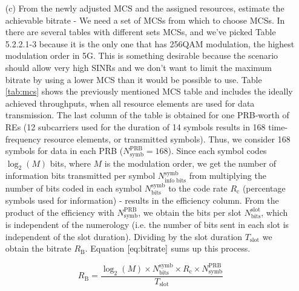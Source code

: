\begin{itemize}
\begin{itemize}
        \item[(c)] From the newly adjusted MCS and the assigned resources, estimate the achievable bitrate - 
        We need a set of MCSs from which to choose MCSs. In \cite{3gpp-codebooks} there are several tables with different sets MCSs, and we've picked Table 5.2.2.1-3 because it is the only one that has 256QAM modulation, the highest modulation order in 5G. This is something desirable because the scenario should allow very high SINRs and we don't want to limit the maximum bitrate by using a lower MCS than it would be possible to use. Table \ref{tab:mcs} shows the previously mentioned MCS table and includes the ideally achieved throughputs, when all resource elements are used for data transmission. The last column of the table is obtained for one PRB-worth of \acsp{RE} (12 subcarriers used for the duration of 14 symbols results in 168 time-frequency resource elements, or transmitted symbols). Thus, we consider 168 symbols for data in each PRB ($N_\text{symb}^\text{PRB} = 168$). Since each symbol codes $\log_2(M)$ bits, where $M$ is the modulation order, we get the number of information bits transmitted per symbol $N_\text{info bits}^\text{symb}$ from multiplying the number of bits coded in each symbol $N_\text{bits}^\text{symb}$ to the code rate $R_\text{c}$ (percentage symbols used for information) - results in the efficiency column. From the product of the efficiency with $N_\text{symb}^\text{PRB}$, we obtain the bits per slot $N_\text{bits}^\text{slot}$, which is independent of the numerology (i.e. the number of bits sent in each slot is independent of the slot duration). Dividing by the slot duration $T_\text{slot}$ we obtain the bitrate $R_\text{B}$. Equation $\eqref{eq:bitrate}$ sums up this process.




        \begin{equation} \label{eq:bitrate}
            R_\text{B} = \frac{\log_2(M) \times N_\text{bits}^\text{symb} \times R_\text{c} \times N_\text{symb}^\text{PRB}}{T_\text{slot}}
        \end{equation}


\end{itemize}
\end{itemize}
